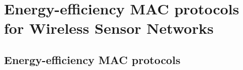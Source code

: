 
\chapter{Energy-efficiency MAC protocols for Wireless Sensor Networks} %
\label{soa}
\section{Energy-efficiency MAC protocols}
